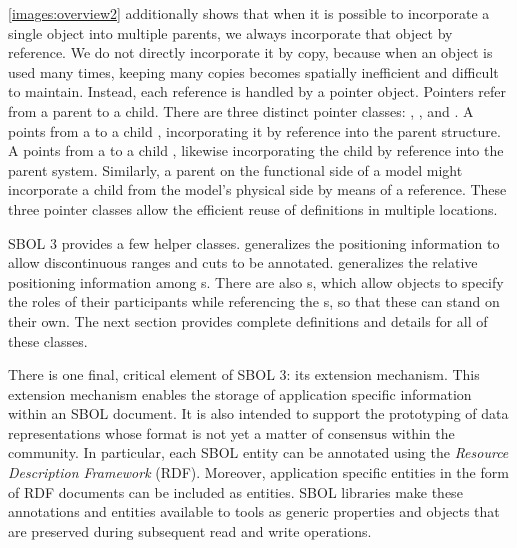 \ref{images:overview2} additionally shows that when it is possible to incorporate a single object into multiple parents, we always incorporate that object by reference. We do not directly incorporate it by copy, because when an object is used many times, keeping many copies becomes spatially inefficient and difficult to maintain. Instead, each reference is handled by a pointer object. 
Pointers refer from a parent to a child. There are three distinct pointer classes: , , and . A  points from a  to a child , incorporating it by reference into the parent structure. A  points from a  to a child , likewise incorporating the child by reference into the parent system. Similarly, a parent  on the functional side of a model might incorporate a child  from the model's physical side by means of a  reference. These three pointer classes allow the efficient reuse of definitions in multiple locations.

SBOL 3 provides a few helper classes.   generalizes the positioning information to allow discontinuous ranges and cuts to be annotated.   generalizes the relative positioning information among s.  
There are also s, which allow  objects to specify the roles of their participants while referencing the s, so that these can stand on their own.
The next section provides complete definitions and details for all of these classes.

There is one final, critical element of SBOL 3: its extension mechanism. This extension mechanism enables the storage of application specific information within an SBOL document. It is also intended to support the prototyping of data representations whose format is not yet a matter of consensus within the community. In particular, each SBOL entity can be annotated using the \emph{Resource Description Framework} (RDF). Moreover, application specific entities in the form of RDF documents can be included as  entities. SBOL libraries make these annotations and entities available to tools as generic properties and objects that are preserved during subsequent read and write operations.
